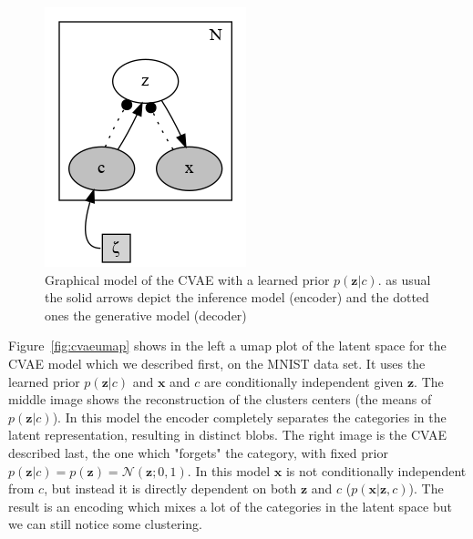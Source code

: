\documentclass[11pt, a4paper]{report}
\theoremstyle{plain}
\theoremstyle{definition}
\theoremstyle{remark}
\newcommand{\x}{\mathbf{x}}
\newcommand{\z}{\mathbf{z}}
\newcommand{\NN}{\mathcal{N}}
\begin{document}
\begin{figure}[!h]
\begin{framed}
\centering
\includegraphics[width=0.4 \textwidth]{plots/cvae.gv.png}
\caption{Graphical model of the CVAE with a learned prior $p(\z | c)$.
as usual the solid arrows depict the inference model (encoder) and the dotted
ones the generative model (decoder)}
\label{fig:cvae}
\end{framed}
\end{figure}

Figure~\ref{fig:cvaeumap} shows in the left a umap plot of the latent space for
the CVAE model which we described first, on the MNIST data set.
It uses the learned prior $p(\z|c)$ and
$\x$ and $c$ are conditionally independent given $\z$.
The middle image shows the reconstruction of the clusters centers (the means of
$p(\z | c)$). In this model the encoder completely separates the categories in
the latent representation, resulting in distinct blobs.
The right image is the CVAE described last, the one which "forgets" the
category, with fixed prior $p(\z | c) = p(\z) = \NN(\z;0,1)$.
In this model $\x$ is not conditionally independent from $c$, but instead it 
is directly dependent on both $\z$ and $c$ ($p(\x | \z, c)$).
The result is an encoding which mixes a lot of the categories in the latent
space but we can still notice some clustering.
\end{document}
